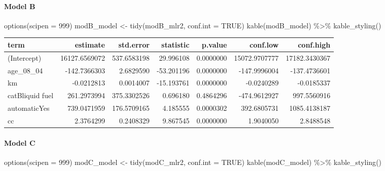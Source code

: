 \documentclass[
]{article}
\newenvironment{Shaded}{\begin{snugshade}}{\end{snugshade}}
\newcommand{\AttributeTok}[1]{\textcolor[rgb]{0.77,0.63,0.00}{#1}}
\newcommand{\ConstantTok}[1]{\textcolor[rgb]{0.00,0.00,0.00}{#1}}
\newcommand{\DecValTok}[1]{\textcolor[rgb]{0.00,0.00,0.81}{#1}}
\newcommand{\FunctionTok}[1]{\textcolor[rgb]{0.00,0.00,0.00}{#1}}
\newcommand{\NormalTok}[1]{#1}
\newcommand{\OtherTok}[1]{\textcolor[rgb]{0.56,0.35,0.01}{#1}}
\newcommand{\SpecialCharTok}[1]{\textcolor[rgb]{0.00,0.00,0.00}{#1}}
\begin{document}
\hypertarget{model-b-12}{%
\paragraph{Model B}\label{model-b-12}}

\begin{Shaded}
\begin{Highlighting}[]
\FunctionTok{options}\NormalTok{(}\AttributeTok{scipen =} \DecValTok{999}\NormalTok{)}
\NormalTok{modB\_model }\OtherTok{\textless{}{-}} \FunctionTok{tidy}\NormalTok{(modB\_mlr2, }\AttributeTok{conf.int =} \ConstantTok{TRUE}\NormalTok{)}
\FunctionTok{kable}\NormalTok{(modB\_model) }\SpecialCharTok{\%\textgreater{}\%}
  \FunctionTok{kable\_styling}\NormalTok{()}
\end{Highlighting}
\end{Shaded}

\begin{table}
\centering
\begin{tabular}{l|r|r|r|r|r|r}
\hline
term & estimate & std.error & statistic & p.value & conf.low & conf.high\\
\hline
(Intercept) & 16127.6569072 & 537.6583198 & 29.996108 & 0.0000000 & 15072.9707777 & 17182.3430367\\
\hline
age\_08\_04 & -142.7366303 & 2.6829590 & -53.201196 & 0.0000000 & -147.9996004 & -137.4736601\\
\hline
km & -0.0212813 & 0.0014007 & -15.193761 & 0.0000000 & -0.0240289 & -0.0185337\\
\hline
catBliquid fuel & 261.2973994 & 375.3302526 & 0.696180 & 0.4864296 & -474.9612927 & 997.5560916\\
\hline
automaticYes & 739.0471959 & 176.5709165 & 4.185555 & 0.0000302 & 392.6805731 & 1085.4138187\\
\hline
cc & 2.3764299 & 0.2408329 & 9.867545 & 0.0000000 & 1.9040050 & 2.8488548\\
\hline
\end{tabular}
\end{table}

\hypertarget{model-c-11}{%
\paragraph{Model C}\label{model-c-11}}

\begin{Shaded}
\begin{Highlighting}[]
\FunctionTok{options}\NormalTok{(}\AttributeTok{scipen =} \DecValTok{999}\NormalTok{)}
\NormalTok{modC\_model }\OtherTok{\textless{}{-}} \FunctionTok{tidy}\NormalTok{(modC\_mlr2, }\AttributeTok{conf.int =} \ConstantTok{TRUE}\NormalTok{)}
\FunctionTok{kable}\NormalTok{(modC\_model) }\SpecialCharTok{\%\textgreater{}\%}
  \FunctionTok{kable\_styling}\NormalTok{()}
\end{Highlighting}
\end{Shaded}
\end{document}

